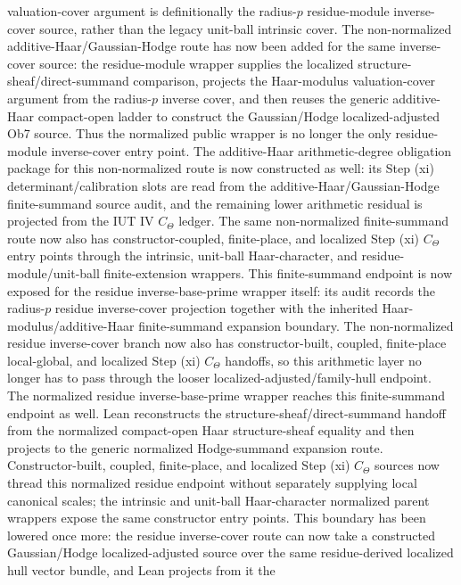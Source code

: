 \documentclass[11pt]{article}
\newcommand{\CTheta}{C_\Theta}
\theoremstyle{plain}
\theoremstyle{definition}
\theoremstyle{remark}
\begin{document}
  valuation-cover argument is definitionally the radius-\(p\) residue-module
  inverse-cover source, rather than the legacy unit-ball intrinsic cover.  The
  non-normalized additive-Haar/Gaussian-Hodge route has now been added for the
  same inverse-cover source: the residue-module wrapper supplies the localized
  structure-sheaf/direct-summand comparison, projects the Haar-modulus
  valuation-cover argument from the radius-\(p\) inverse cover, and then reuses
  the generic additive-Haar compact-open ladder to construct the
  Gaussian/Hodge localized-adjusted Ob7 source.  Thus the normalized public
  wrapper is no longer the only residue-module inverse-cover entry point.  The
  additive-Haar arithmetic-degree obligation package for this non-normalized
  route is now constructed as well: its Step (xi) determinant/calibration slots
  are read from the additive-Haar/Gaussian-Hodge finite-summand source audit,
  and the remaining lower arithmetic residual is projected from the IUT IV
  \(\CTheta\) ledger.  The same non-normalized finite-summand route now also
  has constructor-coupled, finite-place, and localized Step (xi) \(\CTheta\)
  entry points through the intrinsic, unit-ball Haar-character, and
  residue-module/unit-ball finite-extension wrappers.  This finite-summand
  endpoint is now exposed for the residue inverse-base-prime wrapper itself:
  its audit records the radius-\(p\)
  residue inverse-cover projection together with the inherited
  Haar-modulus/additive-Haar finite-summand expansion boundary.  The
  non-normalized residue inverse-cover branch now also has constructor-built,
  coupled, finite-place local-global, and localized Step (xi) \(\CTheta\)
  handoffs, so this arithmetic layer no longer has to pass through the looser
  localized-adjusted/family-hull endpoint.  The normalized
  residue inverse-base-prime wrapper reaches this finite-summand endpoint as
  well.  Lean reconstructs the structure-sheaf/direct-summand handoff from the
  normalized compact-open Haar structure-sheaf equality and then projects to
  the generic normalized Hodge-summand expansion route.  Constructor-built,
  coupled, finite-place, and localized Step (xi) \(\CTheta\) sources now thread
  this normalized residue endpoint without separately supplying local canonical
  scales; the intrinsic and unit-ball Haar-character normalized parent
  wrappers expose the same constructor entry points.  This boundary has been
  lowered once more: the residue inverse-cover
  route can now take a constructed Gaussian/Hodge localized-adjusted source
  over the same
  residue-derived localized hull vector bundle, and Lean projects from it the
\end{document}
